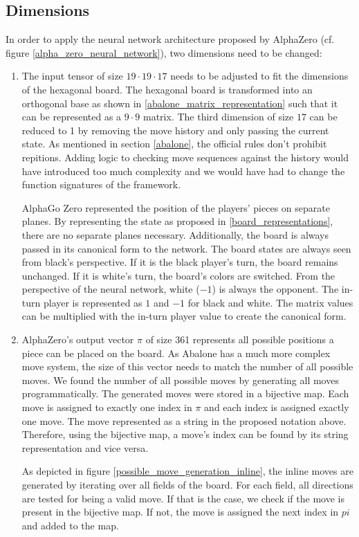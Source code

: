 \subsection{Dimensions}
In order to apply the neural network architecture proposed by AlphaZero (cf. figure \ref{alpha_zero_neural_network}), two dimensions need to be changed:
\begin{enumerate}
    \item The input tensor of size $19 \cdot 19 \cdot 17$ needs to be adjusted to fit the dimensions of the hexagonal board. The hexagonal board is transformed into an orthogonal base as shown in \ref{abalone_matrix_representation} such that it can be represented as a $9 \cdot 9$ matrix.
          The third dimension of size $17$ can be reduced to 1 by removing the move history and only passing the current state. As mentioned in section \ref{abalone}, the official rules don't prohibit repitions. Adding logic to checking move sequences against the history would have introduced too much complexity and we would have had to change the function signatures of the framework.

          AlphaGo Zero represented the position of the players' pieces on separate planes. By representing the state as proposed in \ref{board_representations}, there are no separate planes necessary. Additionally, the board is always passed in its canonical form to the network. The board states are always seen from black's perspective. If it is the black player's turn, the board remains unchanged. If it is white's turn, the board's colors are switched. From the perspective of the neural network, white ($-1$) is always the opponent. The in-turn player is represented as $1$ and $-1$ for black and white. The matrix values can be multiplied with the in-turn player value to create the canonical form.
    \item AlphaZero's output vector $\pi$ of size 361 represents all possible positions a piece can be placed on the board. As Abalone has a much more complex move system, the size of this vector needs to match the number of all possible moves. We found the number of all possible moves by generating all moves programmatically. The generated moves were stored in a bijective map. Each move is assigned to exactly one index in $\pi$ and each index is assigned exactly one move. The move represented as a string in the proposed notation above. Therefore, using the bijective map, a move's index can be found by its string representation and vice versa.

          As depicted in figure \ref{possible_move_generation_inline}, the inline moves are generated by iterating over all fields of the board. For each field, all directions are tested for being a valid move. If that is the case, we check if the move is present in the bijective map. If not, the move is assigned the next index in $pi$ and added to the map.


\end{enumerate}
